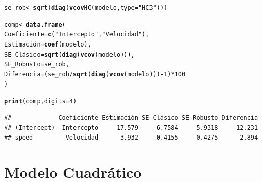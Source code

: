 \documentclass[10pt, spanish]{article}\usepackage[]{graphicx}\usepackage[]{xcolor}
\makeatletter
\newcommand{\hlnum}[1]{\textcolor[rgb]{0.686,0.059,0.569}{#1}}%
\newcommand{\hlsng}[1]{\textcolor[rgb]{0.192,0.494,0.8}{#1}}%
\newcommand{\hlopt}[1]{\textcolor[rgb]{0,0,0}{#1}}%
\newcommand{\hldef}[1]{\textcolor[rgb]{0.345,0.345,0.345}{#1}}%
\newcommand{\hlkwb}[1]{\textcolor[rgb]{0.69,0.353,0.396}{#1}}%
\newcommand{\hlkwc}[1]{\textcolor[rgb]{0.333,0.667,0.333}{#1}}%
\newcommand{\hlkwd}[1]{\textcolor[rgb]{0.737,0.353,0.396}{\textbf{#1}}}%
\newenvironment{kframe}{%
 \def\at@end@of@kframe{}%
 \ifinner\ifhmode%
  \def\at@end@of@kframe{\end{minipage}}%
  \begin{minipage}{\columnwidth}%
 \fi\fi%
 \def\FrameCommand##1{\hskip\@totalleftmargin \hskip-\fboxsep
 \colorbox{shadecolor}{##1}\hskip-\fboxsep
     \hskip-\linewidth \hskip-\@totalleftmargin \hskip\columnwidth}%
 \MakeFramed {\advance\hsize-\width
   \@totalleftmargin\z@ \linewidth\hsize
   \@setminipage}}%
 {\par\unskip\endMakeFramed%
 \at@end@of@kframe}
\newenvironment{knitrout}{}{} %
\makeatother
\begin{document}
\begin{knitrout}
\color{fgcolor}\begin{kframe}
\begin{alltt}
\hldef{se_rob} \hlkwb{<-} \hlkwd{sqrt}\hldef{(}\hlkwd{diag}\hldef{(}\hlkwd{vcovHC}\hldef{(modelo,} \hlkwc{type} \hldef{=} \hlsng{"HC3"}\hldef{)))}

\hldef{comp} \hlkwb{<-} \hlkwd{data.frame}\hldef{(}
  \hlkwc{Coeficiente} \hldef{=} \hlkwd{c}\hldef{(}\hlsng{"Intercepto"}\hldef{,} \hlsng{"Velocidad"}\hldef{),}
  \hlkwc{Estimación} \hldef{=} \hlkwd{coef}\hldef{(modelo),}
  \hlkwc{SE_Clásico} \hldef{=} \hlkwd{sqrt}\hldef{(}\hlkwd{diag}\hldef{(}\hlkwd{vcov}\hldef{(modelo))),}
  \hlkwc{SE_Robusto} \hldef{= se_rob,}
  \hlkwc{Diferencia} \hldef{= (se_rob} \hlopt{/} \hlkwd{sqrt}\hldef{(}\hlkwd{diag}\hldef{(}\hlkwd{vcov}\hldef{(modelo)))} \hlopt{-} \hlnum{1}\hldef{)} \hlopt{*} \hlnum{100}
\hldef{)}

\hlkwd{print}\hldef{(comp,} \hlkwc{digits} \hldef{=} \hlnum{4}\hldef{)}
\end{alltt}
\begin{verbatim}
##             Coeficiente Estimación SE_Clásico SE_Robusto Diferencia
## (Intercept)  Intercepto    -17.579     6.7584     5.9318    -12.231
## speed         Velocidad      3.932     0.4155     0.4275      2.894
\end{verbatim}
\end{kframe}
\end{knitrout}

\section{Modelo Cuadrático}
\end{document}
